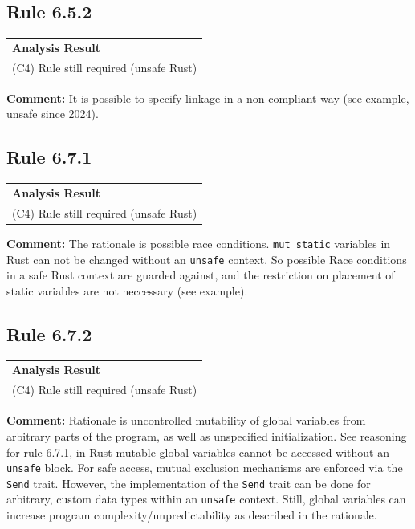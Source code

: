 \subsection*{Rule 6.5.2}
\begin{longtable}{p{13cm}}
\textbf{Analysis Result} \\
(C4) Rule still required (unsafe Rust) \\
\end{longtable}
\textbf{Comment:} It is possible to specify linkage in a non-compliant way (see example, unsafe since 2024). \\


\subsection*{Rule 6.7.1}
\begin{longtable}{p{13cm}}
\textbf{Analysis Result} \\
(C4) Rule still required (unsafe Rust) \\
\end{longtable}
\textbf{Comment:} The rationale is possible race conditions. \texttt{mut static} variables in Rust can not be changed without an \texttt{unsafe} context. So possible Race conditions in a safe Rust context are guarded against, and the restriction on placement of static variables are not neccessary (see example). \\


\subsection*{Rule 6.7.2}
\begin{longtable}{p{13cm}}
\textbf{Analysis Result} \\
(C4) Rule still required (unsafe Rust) \\
\end{longtable}
\textbf{Comment:} Rationale is uncontrolled mutability of global variables from arbitrary parts of the program, as well as unspecified initialization. See reasoning for rule 6.7.1, in Rust mutable global variables cannot be accessed without an \texttt{unsafe} block. For safe access, mutual exclusion mechanisms are enforced via the \texttt{Send} trait. However, the implementation of the \texttt{Send} trait can be done for arbitrary, custom data types within an \texttt{unsafe} context. Still, global variables can increase program complexity/unpredictability as described in the rationale. \\
